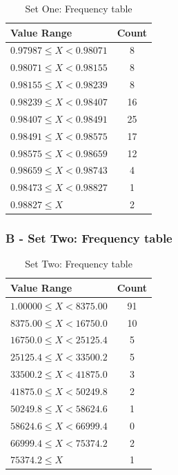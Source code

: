 \documentclass[10pt]{report}
\begin{document}
\begin{table}[h!]
    \centering

    \begin{tabular}{ | l | c | }
        \hline
        Value Range & Count \\
        \hline
        $0.97987 \leq X < 0.98071$ & 8  \\
        $0.98071 \leq X < 0.98155$ & 8  \\
        $0.98155 \leq X < 0.98239$ & 8  \\
        $0.98239 \leq X < 0.98407$ & 16 \\
        $0.98407 \leq X < 0.98491$ & 25 \\
        $0.98491 \leq X < 0.98575$ & 17 \\
        $0.98575 \leq X < 0.98659$ & 12 \\
        $0.98659 \leq X < 0.98743$ & 4  \\
        $0.98473 \leq X < 0.98827$ & 1  \\
        $0.98827 \leq X$           & 2  \\
        \hline
    \end{tabular}
    \caption{Set One: Frequency table}
\end{table}



\subsubsection*{B - Set Two: Frequency table}

\begin{table}[h!]
    \centering

    \begin{tabular}{ | l | c | }
        \hline
        Value Range & Count \\
        \hline
        $1.00000 \leq X < 8375.00$ & 91 \\
        $8375.00 \leq X < 16750.0$ & 10 \\
        $16750.0 \leq X < 25125.4$ & 5  \\
        $25125.4 \leq X < 33500.2$ & 5  \\
        $33500.2 \leq X < 41875.0$ & 3  \\
        $41875.0 \leq X < 50249.8$ & 2  \\
        $50249.8 \leq X < 58624.6$ & 1  \\
        $58624.6 \leq X < 66999.4$ & 0  \\
        $66999.4 \leq X < 75374.2$ & 2  \\
        $75374.2 \leq X$           & 1  \\
        \hline
    \end{tabular}
    \caption{Set Two: Frequency table}
\end{table}
\end{document}
